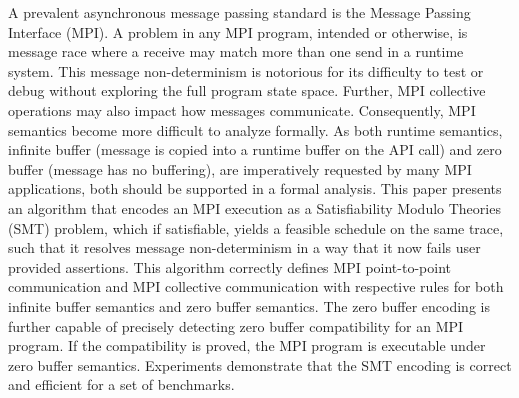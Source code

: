 %
A prevalent asynchronous message passing standard is the Message Passing Interface (MPI).
%
A problem in any MPI program, intended or otherwise, is message race where a receive may match more than one send in a runtime system.
%
This message non-determinism is notorious for its difficulty to test or debug without exploring the full program state space. 
%
Further, MPI collective operations may also impact how messages communicate.
%
Consequently, MPI semantics become more difficult to analyze formally. 
%
As both runtime semantics, infinite buffer (message is copied into a runtime buffer on the API call) and zero buffer (message has no buffering), are imperatively requested by many MPI applications, both should be supported in a formal analysis. 
%
This paper presents an algorithm that encodes an MPI execution as a Satisfiability Modulo Theories (SMT) problem, which if satisfiable, yields a feasible schedule on the same trace, such that it resolves message non-determinism in a way that it now fails user provided assertions.
%
This algorithm correctly defines MPI point-to-point communication and MPI collective communication with respective rules for both infinite buffer semantics and zero buffer semantics. 
%
The zero buffer encoding is further capable of precisely detecting zero buffer compatibility for an MPI program. 
%
If the compatibility is proved, the MPI program is executable under zero buffer semantics.
%
Experiments demonstrate that the SMT encoding is correct and efficient for a set of benchmarks. 
%
